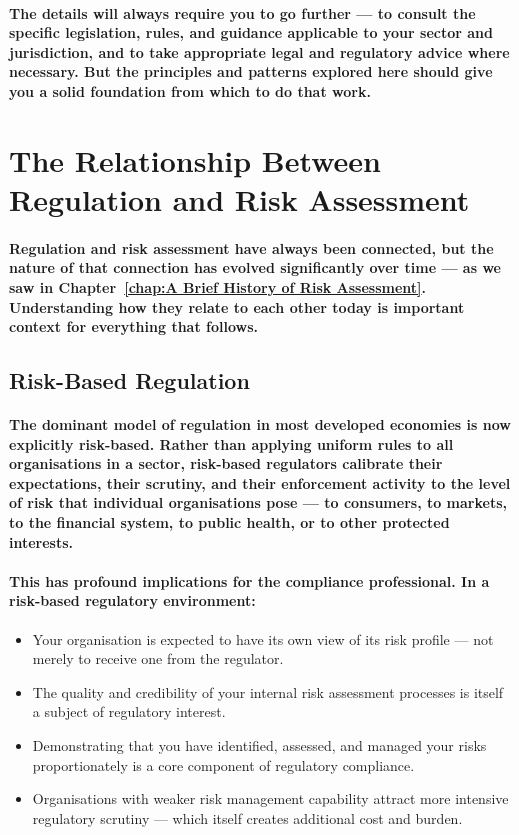 \paragraph{The details will always require you to go further — to consult the specific legislation, rules, and guidance applicable to your sector and jurisdiction, and to take appropriate legal and regulatory advice where necessary. But the principles and patterns explored here should give you a solid foundation from which to do that work.}

\section{The Relationship Between Regulation and Risk Assessment}
\paragraph{Regulation and risk assessment have always been connected, but the nature of that connection has evolved significantly over time — as we saw in Chapter~\ref{chap:A Brief History of Risk Assessment}. Understanding how they relate to each other today is important context for everything that follows.}

\subsection{Risk-Based Regulation}
\paragraph{The dominant model of regulation in most developed economies is now explicitly \textbf{risk-based}. Rather than applying uniform rules to all organisations in a sector, risk-based regulators calibrate their expectations, their scrutiny, and their enforcement activity to the level of risk that individual organisations pose — to consumers, to markets, to the financial system, to public health, or to other protected interests.}
\paragraph{This has profound implications for the compliance professional. In a risk-based regulatory environment:}
\begin{itemize}
    \item{Your organisation is expected to have its own view of its risk profile — not merely to receive one from the regulator.}
    \item{The quality and credibility of your internal risk assessment processes is itself a subject of regulatory interest.}
    \item{Demonstrating that you have identified, assessed, and managed your risks proportionately is a core component of regulatory compliance.}
    \item{Organisations with weaker risk management capability attract more intensive regulatory scrutiny — which itself creates additional cost and burden.}
\end{itemize}
